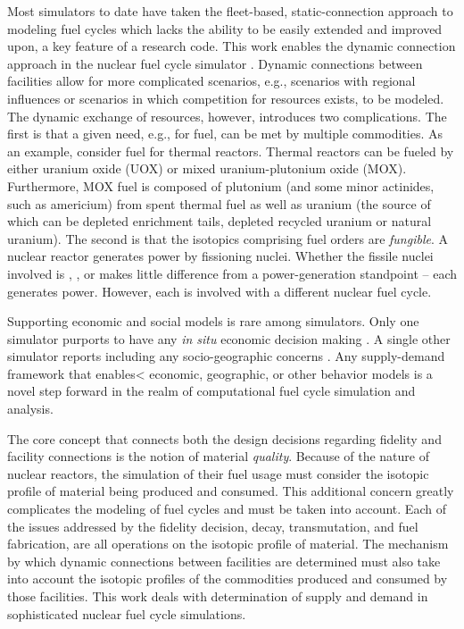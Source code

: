 Most simulators to date have taken the fleet-based, static-connection approach
to modeling fuel cycles which lacks the ability to be easily extended and
improved upon, a key feature of a research code. This work enables the dynamic
connection approach in the \Cyclus nuclear fuel cycle simulator . Dynamic
connections between facilities allow for more complicated scenarios, e.g.,
scenarios with regional influences or scenarios in which competition for
resources exists, to be modeled. The dynamic exchange of resources, however,
introduces two complications. The first is that a given need, e.g., for fuel,
can be met by multiple commodities. As an example, consider fuel for thermal
reactors. Thermal reactors can be fueled by either uranium oxide (UOX) or mixed
uranium-plutonium oxide (MOX). Furthermore, MOX fuel is composed of plutonium
(and some minor actinides, such as americium) from spent thermal fuel as well as
uranium (the source of which can be depleted enrichment tails, depleted recycled
uranium or natural uranium). The second is that the isotopics comprising fuel
orders are \textit{fungible}. A nuclear reactor generates power by fissioning
nuclei. Whether the fissile nuclei involved is , , or
 makes little difference from a power-generation standpoint -- each
generates power. However, each is involved with a different nuclear fuel cycle.

Supporting economic and social models is rare among simulators. Only one
simulator purports to have any \textit{in situ} economic decision making
\cite{van_den_durpel_daness_2009}. A single other simulator reports including
any socio-geographic concerns \cite{andrianova_desae_2008}. Any supply-demand
framework that enables< economic, geographic, or other behavior models is a
novel step forward in the realm of computational fuel cycle simulation and
analysis.

The core concept that connects both the design decisions regarding fidelity and
facility connections is the notion of material \textit{quality}. Because of the
nature of nuclear reactors, the simulation of their fuel usage must consider the
isotopic profile of material being produced and consumed. This additional
concern greatly complicates the modeling of fuel cycles and must be taken into
account. Each of the issues addressed by the fidelity decision, decay,
transmutation, and fuel fabrication, are all operations on the isotopic profile
of material. The mechanism by which dynamic connections between facilities are
determined must also take into account the isotopic profiles of the commodities
produced and consumed by those facilities. This work deals with determination of
supply and demand in sophisticated nuclear fuel cycle simulations.
